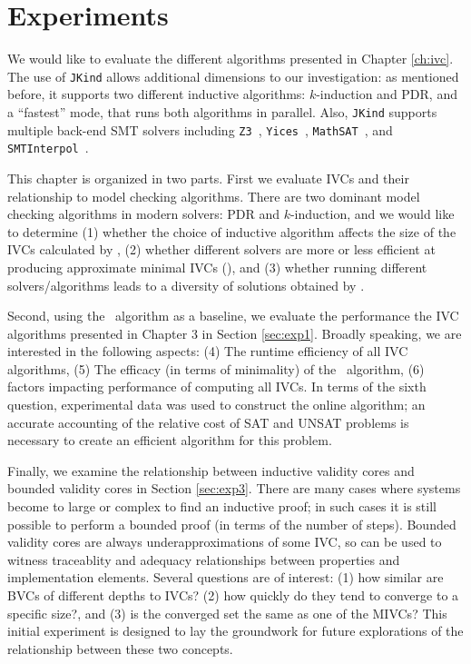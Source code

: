 \chapter{Experiments}
\label{ch:experiment}

\newcommand{\takeaway}[1]{
\vspace{12pt}
\noindent\fbox{\parbox{\textwidth}{#1}}
\vspace{6pt}
}
We would like to evaluate the different algorithms presented in Chapter \ref{ch:ivc}.
 The use of \texttt{JKind} allows additional dimensions to our investigation: as mentioned before, it supports two different inductive algorithms: $k$-induction and PDR, and a ``fastest'' mode, that runs both algorithms in parallel.  Also, \texttt{JKind} supports multiple back-end SMT solvers including \texttt{Z3}~\cite{DeMoura08:z3}, \texttt{Yices}~\cite{Dutertre06:yices}, \texttt{MathSAT}~\cite{Cimatti2013:MathSAT}, and \texttt{SMTInterpol}~\cite{Christ2012:SMTInterpol}.

This chapter is organized in two parts. First we evaluate IVCs and their relationship to model checking algorithms.  There are two dominant model checking algorithms in modern solvers: PDR and $k$-induction, and we would like to determine (1) whether the choice of inductive algorithm affects the size of the IVCs calculated by \ucalg, (2) whether different solvers are more or less efficient at producing approximate minimal IVCs (\ucalg), and (3) whether running different solvers/algorithms leads to a diversity of solutions obtained by \ucalg .

Second, using the \ucalg\ algorithm as a baseline, we evaluate the performance the IVC algorithms presented in Chapter 3 in Section \ref{sec:exp1}. Broadly speaking, we are interested in the following aspects: (4) The runtime efficiency of all IVC algorithms, (5) The efficacy (in terms of minimality) of the \ucalg\ algorithm, (6) factors impacting performance of computing all IVCs.  In terms of the sixth question, experimental data was used to construct the online algorithm; an accurate accounting of the relative cost of SAT and UNSAT problems is necessary to create an efficient algorithm for this problem.

Finally, we examine the relationship between inductive validity cores and bounded validity cores in Section \ref{sec:exp3}.  There are many cases where systems become to large or complex to find an inductive proof; in such cases it is still possible to perform a bounded proof (in terms of the number of steps).  Bounded validity cores are always underapproximations of some IVC, so can be used to witness traceablity and adequacy relationships between properties and implementation elements.  Several questions are of interest: (1) how similar are BVCs of different depths to IVCs?  (2) how quickly do they tend to converge to a specific size?, and (3) is the converged set the same as one of the MIVCs?  This initial experiment is designed to lay the groundwork for future explorations of the relationship between these two concepts.


